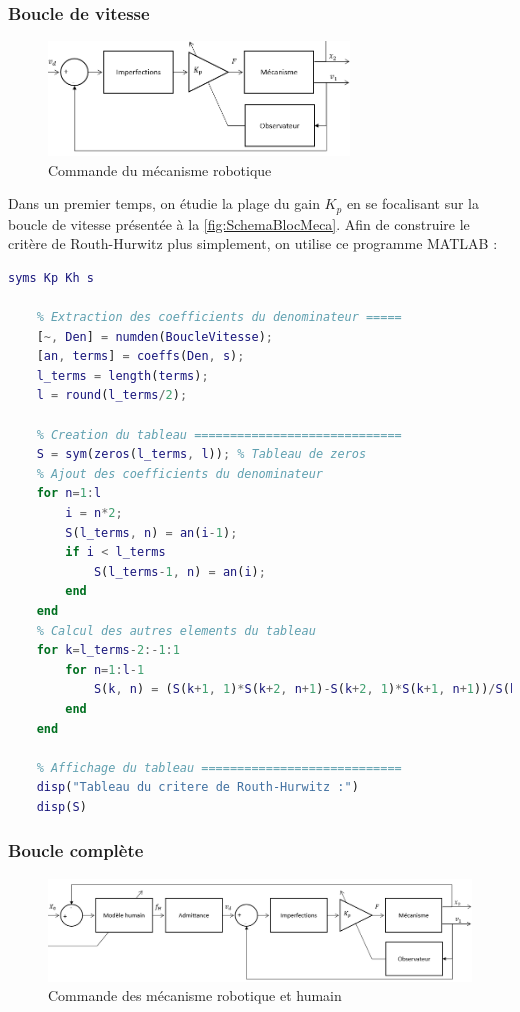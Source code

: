 \documentclass[a4paper,12pt]{article}
\begin{document}
\subsubsection{Boucle de vitesse}
\begin{figure}[h!]
    \centering
    \includegraphics[width=8cm]{./img/cmd_meca_rob_hum_vit.png}
    \caption{Commande du mécanisme robotique}
    \label{fig:SchemaBlocMeca}
\end{figure}
Dans un premier temps, on étudie la plage du gain $K_p$ en se focalisant sur la boucle de vitesse présentée à la \autoref{fig:SchemaBlocMeca}. Afin de construire le critère de Routh-Hurwitz plus simplement, on utilise ce programme MATLAB : \\
\begin{lstlisting}[language=Matlab]
    syms Kp Kh s

    % Extraction des coefficients du denominateur =====
    [~, Den] = numden(BoucleVitesse);
    [an, terms] = coeffs(Den, s);
    l_terms = length(terms);
    l = round(l_terms/2);

    % Creation du tableau =============================
    S = sym(zeros(l_terms, l)); % Tableau de zeros
    % Ajout des coefficients du denominateur
    for n=1:l
        i = n*2;
        S(l_terms, n) = an(i-1);
        if i < l_terms
            S(l_terms-1, n) = an(i);
        end
    end
    % Calcul des autres elements du tableau
    for k=l_terms-2:-1:1
        for n=1:l-1
            S(k, n) = (S(k+1, 1)*S(k+2, n+1)-S(k+2, 1)*S(k+1, n+1))/S(k+1, 1);
        end
    end

    % Affichage du tableau ============================
    disp("Tableau du critere de Routh-Hurwitz :")
    disp(S)
\end{lstlisting}

\subsubsection{Boucle complète}
\begin{figure}[h!]
    \centering
    \includegraphics[width=14cm]{./img/cmd_meca_rob_hum.png}
    \caption{Commande des mécanisme robotique et humain}
    \label{fig:SchemaBlocComplet}
\end{figure}
\end{document}
